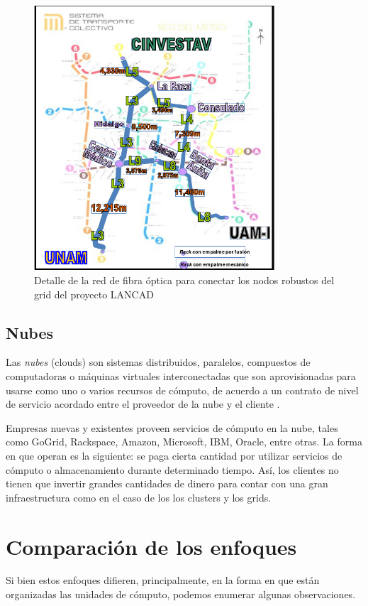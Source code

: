 \begin{figure}
    \begin{center}
        \includegraphics[width=0.8\textwidth]{imagenes/LANCAD-mapa-fo}
    \end{center}
    \caption{Detalle de la red de fibra óptica para conectar los nodos robustos del grid del proyecto LANCAD}
    \label{fig:LANCAD-mapa-fo}
\end{figure}


\subsection{Nubes}
Las \emph{nubes} (clouds) son sistemas distribuidos, paralelos, compuestos de computadoras o máquinas virtuales interconectadas que son aprovisionadas para usarse como uno o varios recursos de cómputo, de acuerdo a un contrato de nivel de servicio acordado entre el proveedor de la nube y el cliente \cite{buyya2009cloud}. 

Empresas nuevas y existentes proveen servicios de cómputo en la nube, tales como GoGrid, Rackspace, Amazon, Microsoft, IBM, Oracle, entre otras. La forma en que operan es la siguiente: se paga cierta cantidad por utilizar servicios de cómputo o almacenamiento durante determinado tiempo. Así, los clientes no tienen que invertir grandes cantidades de dinero para contar con una gran infraestructura como en el caso de los los clusters y los grids.

\section{Comparación de los enfoques}
Si bien estos enfoques difieren, principalmente, en la forma en que están organizadas las unidades de cómputo, podemos enumerar algunas observaciones.

